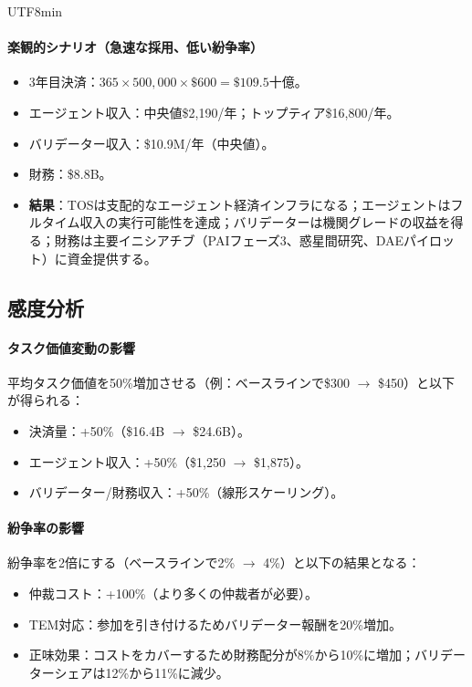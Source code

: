\documentclass[11pt]{article}
\begin{document}
\begin{CJK}{UTF8}{min}
\paragraph{楽観的シナリオ（急速な採用、低い紛争率）}
\begin{itemize}[noitemsep]
  \item 3年目決済：$365 \times 500{,}000 \times \$600 = \$109.5$十億。
  \item エージェント収入：中央値\$2{,}190/年；トップティア\$16{,}800/年。
  \item バリデーター収入：\$10.9M/年（中央値）。
  \item 財務：\$8.8B。
  \item \textbf{結果}：TOSは支配的なエージェント経済インフラになる；エージェントはフルタイム収入の実行可能性を達成；バリデーターは機関グレードの収益を得る；財務は主要イニシアチブ（PAIフェーズ3、惑星間研究、DAEパイロット）に資金提供する。
\end{itemize}

\subsection{感度分析}
\paragraph{タスク価値変動の影響}
平均タスク価値を50\%増加させる（例：ベースラインで\$300 $\to$ \$450）と以下が得られる：
\begin{itemize}[noitemsep]
  \item 決済量：+50\%（\$16.4B $\to$ \$24.6B）。
  \item エージェント収入：+50\%（\$1{,}250 $\to$ \$1{,}875）。
  \item バリデーター/財務収入：+50\%（線形スケーリング）。
\end{itemize}

\paragraph{紛争率の影響}
紛争率を2倍にする（ベースラインで2\% $\to$ 4\%）と以下の結果となる：
\begin{itemize}[noitemsep]
  \item 仲裁コスト：+100\%（より多くの仲裁者が必要）。
  \item TEM対応：参加を引き付けるためバリデーター報酬を20\%増加。
  \item 正味効果：コストをカバーするため財務配分が8\%から10\%に増加；バリデーターシェアは12\%から11\%に減少。
\end{itemize}


\end{CJK}
\end{document}

